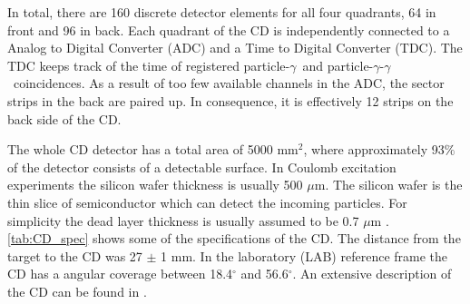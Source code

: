 \documentclass[twoside,english]{uiofysmaster/uiofysmaster}
\newcommand{\ga}{$\gamma$}
\let\orgautoref\autoref
\renewcommand{\autoref}
        {%
		 \def\sectionautorefname{Section}%
		 \def\subsectionautorefname{Section}%
		 \def\subsubsectionautorefname{Section}%
		 \def\chapterautorefname{Chapter}%
          \orgautoref}
\begin{document}
In total, there are 160 discrete detector elements for all four quadrants, 64 in front and 96 in back. 
Each quadrant of the CD is independently connected to a Analog to Digital Converter (ADC) and a Time to Digital Converter (TDC). 
The TDC keeps track of the time of registered particle-\ga\ and particle-\ga-\ga\ coincidences. 
As a result of too few available channels in the ADC, the sector strips in the back are paired up.
In consequence, it is effectively 12 strips on the back side of the CD. 

The whole CD detector has a total area of 5000 mm$^2$, where approximately 93$\%$ of the detector consists of a detectable surface. 
In Coulomb excitation experiments the silicon wafer thickness is usually 500 $\mu$m.
The silicon wafer is the thin slice of semiconductor which can detect the incoming particles. 
For simplicity the dead layer thickness is usually assumed to be 0.7 $\mu$m \cite{NWarr-CD, MB-spect}. 
\autoref{tab:CD_spec} shows some of the specifications of the CD.  
The distance from the target to the CD was 27 $\pm$ 1 mm. 
In the laboratory (LAB) reference frame the CD has a angular coverage between 18.4$^\circ$ and 56.6$^\circ$. An extensive description of the CD can be found in \cite{CD-DSSSD}.

\end{document}
